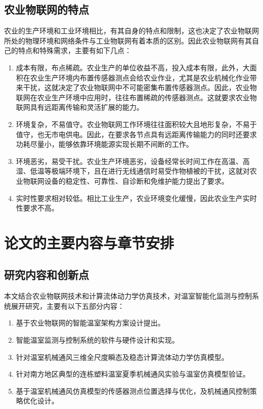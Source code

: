 	\subsection{农业物联网的特点}
	农业的生产环境和工业环境相比，有其自身的特点和限制，这也决定了农业物联网所处的物理环境和网络条件与工业物联网有着本质的区别。因此农业物联网有其自己的特点和特殊需求，主要有如下几点：
	\begin{enumerate}
  			\item 成本有限，布点稀疏。农业生产的单位收益不高，投入成本有限，此外，大面积在农业生产环境内布置传感器测点会给农业作业，尤其是农业机械化作业带来干扰，这就决定了农业物联网中不可能密集布置传感器测点。因此，农业物联网在农业生产环境中应用时，往往布置稀疏的传感器测点。这就要求农业物联网具有远距离传输和灵活扩展的能力。
  			\item 环境复杂，不易值守。农业物联网工作环境往往面积较大且地形复杂，不易于值守，也无市电供电。因此，在要求各节点具有远距离传输能力的同时还要求功耗尽量小，能够依靠环境能源实现长期不间断的工作。
  			\item 环境恶劣，易受干扰。农业生产环境恶劣，设备经常长时间工作在高温、高湿、低温等极端环境下，且在进行无线通信时易受作物植被的干扰，这就对农业物联网设备的稳定性、可靠性、自诊断和免维护能力提出了要求。
  			\item 实时性要求相对较低。相比工业生产，农业环境变化缓慢，因此农业生产实时性要求不高。
	\end{enumerate}


\section{论文的主要内容与章节安排}
	\subsection{研究内容和创新点}
	本文结合农业物联网技术和计算流体动力学仿真技术，对温室智能化监测与控制系统展开研究，主要有以下五部分内容：
		\begin{enumerate}
			\item 基于农业物联网的智能温室架构方案设计提出。
			\item 智能温室监测与控制系统的软件与硬件设计和实现。
			\item 针对温室机械通风三维全尺度瞬态及稳态计算流体动力学仿真模型。
			\item 针对南方地区典型的连栋塑料温室夏季机械通风实验与温室仿真模型验证。
			\item 基于温室机械通风仿真模型的传感器测点位置选择与优化，及机械通风控制策略优化设计。
		\end{enumerate}
		
